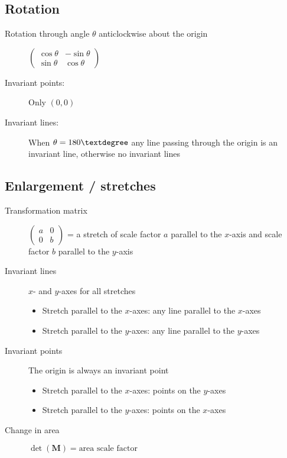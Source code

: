 \subsection{Rotation}
\begin{description}
    \item[Rotation through angle $\theta$ anticlockwise about the origin] $\begin{pmatrix}
                  \cos\theta & -\sin\theta \\\sin\theta&\cos\theta
              \end{pmatrix}$
    \item[Invariant points:] Only $(0,0)$
    \item[Invariant lines:] When $\theta=180\textdegree$ any line passing through the origin is an invariant line, otherwise no invariant lines
\end{description}

\subsection{Enlargement / stretches}
\begin{description}
    \item[Transformation matrix] $\begin{pmatrix}
                  a & 0 \\ 0 & b
              \end{pmatrix}$ = a stretch of scale factor $a$ parallel to the $x$-axis and scale factor $b$ parallel to the $y$-axis
    \item[Invariant lines] $x$- and $y$-axes for all stretches
          \begin{itemize}
              \item Stretch parallel to the $x$-axes: any line parallel to the $x$-axes
              \item Stretch parallel to the $y$-axes: any line parallel to the $y$-axes
          \end{itemize}
    \item[Invariant points] The origin is always an invariant point
          \begin{itemize}
              \item Stretch parallel to the $x$-axes: points on the $y$-axes
              \item Stretch parallel to the $y$-axes: points on the $x$-axes
          \end{itemize}
    \item[Change in area] $\det(\mathbf{M}) = \text{area scale factor}$
\end{description}

